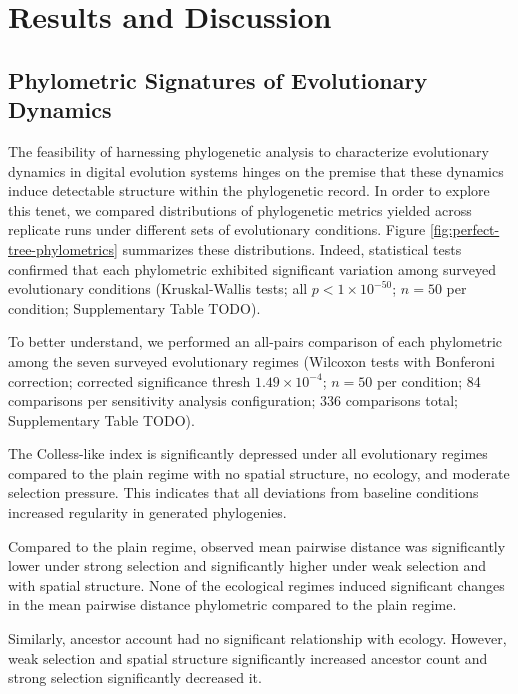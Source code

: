 \section{Results and Discussion} \label{sec:results}

\subsection{Phylometric Signatures of Evolutionary Dynamics}



The feasibility of harnessing phylogenetic analysis to characterize evolutionary dynamics in digital evolution systems hinges on the premise that these dynamics induce detectable structure within the phylogenetic record.
In order to explore this tenet, we compared distributions of phylogenetic metrics yielded across replicate runs under different sets of evolutionary conditions. Figure \ref{fig:perfect-tree-phylometrics} summarizes these distributions.  Indeed, statistical tests confirmed that each phylometric exhibited significant  variation among surveyed evolutionary conditions (Kruskal-Wallis tests; all $p < 1\times10^{-50}$; $n=50$ per condition; Supplementary Table TODO).

To better understand, we performed an all-pairs comparison of each phylometric among the seven surveyed evolutionary regimes (Wilcoxon tests with Bonferoni correction; corrected significance thresh $1.49 \times 10^{-4}$; $n=50$ per condition; 84 comparisons per sensitivity analysis configuration; 336 comparisons total; Supplementary Table TODO).

 The Colless-like index is significantly depressed under all evolutionary regimes compared to the plain regime with no spatial structure, no ecology,  and moderate selection pressure.
This indicates that all deviations from baseline conditions increased regularity in generated phylogenies.

Compared to the plain regime, observed mean pairwise distance was significantly lower under strong selection and significantly higher under weak selection and with spatial structure.
None of the ecological regimes induced significant changes in the mean pairwise distance phylometric compared to the plain regime.

Similarly, ancestor account had no significant relationship with ecology. However, weak selection and spatial structure significantly increased ancestor count and strong selection significantly decreased it.

